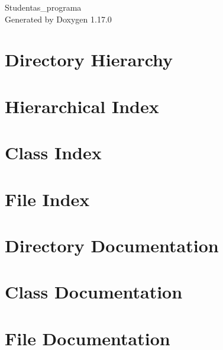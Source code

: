 \documentclass[twoside]{book}
\newcommand{\+}{\discretionary{\mbox{\scriptsize$\hookleftarrow$}}{}{}}
\newcommand{\clearemptydoublepage}{%
    \newpage{\pagestyle{empty}\cleardoublepage}%
  }
\begin{document}
  \raggedbottom
    \hypersetup{pageanchor=false,
                bookmarksnumbered=true,
                pdfencoding=unicode
               }
  \begin{titlepage}
  \vspace*{7cm}
  \begin{center}%
  {\Large Studentas\+\_\+programa}\\
  \vspace*{1cm}
  {\large Generated by Doxygen 1.17.0}\\
  \end{center}
  \end{titlepage}
  \clearemptydoublepage
  \tableofcontents
  \clearemptydoublepage
  \hypersetup{pageanchor=true}
\chapter{Directory Hierarchy}

\chapter{Hierarchical Index}

\chapter{Class Index}

\chapter{File Index}

\chapter{Directory Documentation}

\chapter{Class Documentation}



\chapter{File Documentation}
















  \backmatter
  \newpage
  \clearemptydoublepage
  \printindex
\end{document}
